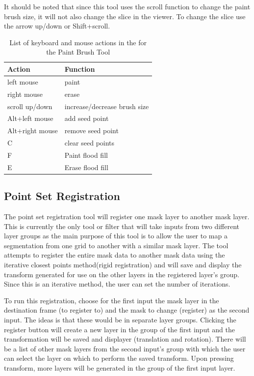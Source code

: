 \documentclass[fleqn,11pt,openany]{book}
\begin{document}
It should be noted that since this tool uses the scroll function to change the paint brush size, it will not also change the slice in the viewer.  To change the slice use the arrow up/down or Shift+scroll.  


\begin{table}[h!]
\label{tab:paintkey}
\caption{List of keyboard and mouse actions in the for the Paint Brush Tool}
\begin{tabular}{|l|l|}
\hline
{\bf Action} & {\bf Function}\\
\hline 
left mouse & paint \\
\hline
right mouse & erase\\
\hline
scroll up/down & increase/decrease brush size\\
\hline
Alt+left mouse & add seed point\\
\hline
Alt+right mouse & remove seed point\\
\hline 
C & clear seed points\\
\hline
F & Paint flood fill\\
\hline
E & Erase flood fill\\ 
\hline
\end{tabular}
\end{table}

\subsection{Point Set Registration}

The point set registration tool will register one mask layer to another mask layer.  This is currently the only tool or filter that will take inputs from two different layer groups as the main purpose of this tool is to allow the user to map a segmentation from one grid to another with a similar mask layer.  The tool attempts to register the entire mask data to another mask data using the iterative closest points method(rigid registration) and will save and display the transform generated for use on the other layers in the registered layer's group.  Since this is an iterative method, the user can set the number of iterations. 

To run this registration, choose for the first input the mask layer in the destination frame (to register to) and the mask to change (register) as the second input.  The ideas is that these would be in separate layer groups.  Clicking the register button will create a new layer in the group of the first input and the transformation will be saved and displayer (translation and rotation).  There will be a list of other mask layers from the second input's group with which the user can select the layer on which to perform the saved transform.  Upon pressing transform, more layers will be generated in the group of the first input layer.  
\end{document}
